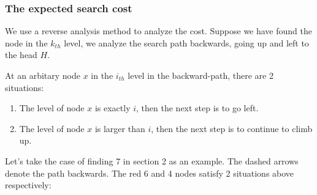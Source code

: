 \subsubsection{The expected search cost}
We use a reverse analysis method to analyze the cost. Suppose we have found the node in the $k_{th}$ level, we analyze the search path backwards, going up and left to the head $H$.\par
At an arbitary node $x$ in the $i_{th}$ level in the backward-path, there are 2 situations:
\begin{enumerate}
    \item The level of node $x$ is exactly $i$, then the next step is to go left.\label{enu:case1}
    \item The level of node $x$ is larger than $i$, then the next step is to continue to climb up.\label{enu:case2}
\end{enumerate}
Let's take the case of finding 7 in section 2 as an example. The dashed arrows denote the path backwards. The red 6 and 4 nodes satisfy 2 situations above respectively:

